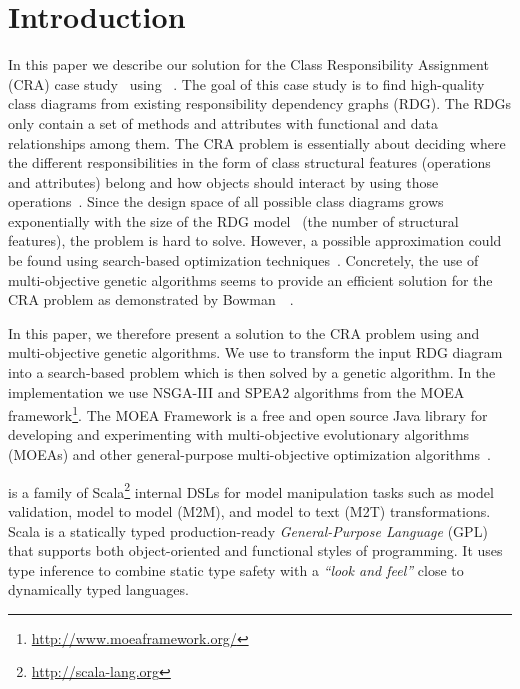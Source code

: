 

\section{Introduction}
\label{sec:Introduction}

In this paper we describe our solution for the \TTC Class Responsibility Assignment (CRA) case study~\cite{Fleck2016} using \SIGMA~\cite{Krikava2014}.
The goal of this case study is to find high-quality class diagrams from existing responsibility dependency graphs (RDG).
The RDGs only contain a set of methods and attributes with functional and data relationships among them.
The CRA problem is essentially about deciding where the different responsibilities in the form of class structural features (\Ie operations and attributes) belong and how objects should interact by using those operations~\cite{bowman2010solving}.
Since the design space of all possible class diagrams grows exponentially with the size of the RDG model~\cite{Fleck2016} (\Ie the number of structural features), the problem is hard to solve.
However, a possible approximation could be found using search-based optimization techniques~\cite{coello2007evolutionary}.
Concretely, the use of multi-objective genetic algorithms seems to provide an efficient solution for the CRA problem as demonstrated by Bowman~\Etal~\cite{bowman2010solving}.

In this paper, we therefore present a solution to the CRA problem using \SIGMA and multi-objective genetic algorithms.
We use \SIGMA to transform the input RDG diagram into a search-based problem which is then solved by a genetic algorithm.
In the implementation we use NSGA-III and SPEA2 algorithms from the MOEA framework\footnote{\url{http://www.moeaframework.org/}}.
The MOEA Framework is a free and open source Java library for developing and experimenting with multi-objective evolutionary algorithms (MOEAs) and other general-purpose multi-objective optimization algorithms~\cite{moea}.

\SIGMA is a family of Scala\footnote{\url{http://scala-lang.org}} internal DSLs for model manipulation tasks such as model validation, model to model (M2M), and model to text (M2T) transformations.
Scala is a statically typed production-ready \emph{General-Purpose Language} (GPL) that supports both object-oriented and functional styles of programming.
It uses type inference to combine static type safety with a \emph{``look and feel''} close to dynamically typed languages.

